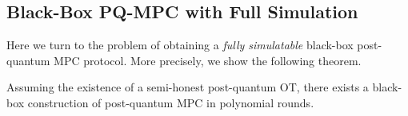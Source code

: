 


\subsection{Black-Box PQ-MPC with Full Simulation}
\label{sec:full-MPC:MPC}
Here we turn to the problem of obtaining a {\em fully simulatable} black-box post-quantum MPC protocol. More precisely, we show the following theorem.

\begin{theorem}\label{thm:mpc:main}
Assuming the existence of a semi-honest post-quantum OT, there exists a black-box construction of post-quantum MPC in polynomial rounds. 
\end{theorem}

